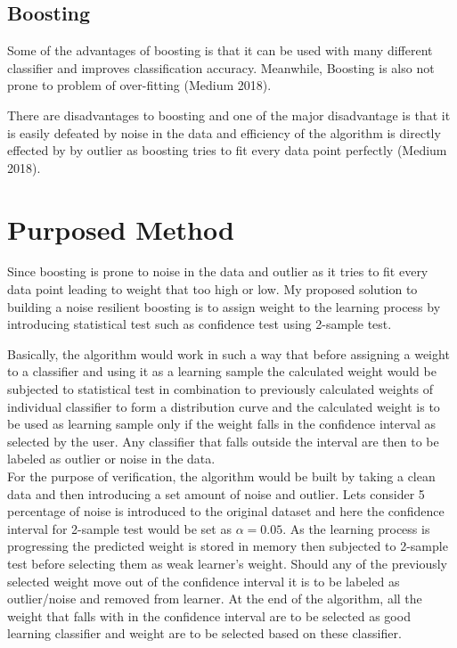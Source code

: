 \documentclass{article}
\begin{document}
\subsection{Boosting}\label{SEC:boosting}
Some of the advantages of boosting is that it can be used with many different classifier and improves classification accuracy. Meanwhile, Boosting is also not prone to problem of over-fitting (Medium 2018). 

There are disadvantages to boosting and one of the major disadvantage is that it is easily defeated by noise in the data and efficiency of the algorithm is directly effected by by outlier as boosting tries to fit every data point perfectly (Medium 2018).

\section{Purposed Method}
Since boosting is prone to noise in the data and outlier as it tries to fit every data point leading to weight that too high or low. My proposed solution to building a noise resilient boosting is to assign weight to the learning process by introducing statistical test such as confidence test using 2-sample test.

Basically, the algorithm would work in such a way that before assigning a weight to a classifier and using it as a learning sample the calculated weight would be subjected to statistical test in combination to previously calculated weights of individual classifier to form a distribution curve and the calculated weight is to be used as learning sample only if the weight falls in the confidence interval as selected by the user. Any classifier that falls outside the interval are then to be labeled as outlier or noise in the data.\\ 
For the purpose of verification, the algorithm would be built by taking a clean data and then introducing a set amount of noise and outlier. Lets consider 5 percentage of noise is introduced to the original dataset and here the confidence interval for 2-sample test would be set as ${\alpha = 0.05}$. As the learning process is progressing the predicted weight is stored in memory then subjected to 2-sample test before selecting them as weak learner's weight. Should any of the previously selected weight move out of the confidence interval it is to be labeled as outlier/noise and removed from learner. At the end of the algorithm, all the weight that falls with in the confidence interval are to be selected as good learning classifier and weight are to be selected based on these classifier. \\
\end{document}
